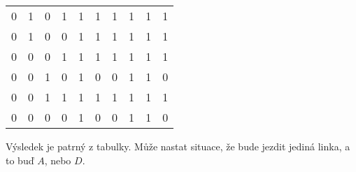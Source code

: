 \begin{example}[SMP 143/13]
\begin{widetext}
\begin{center}
\begin{tabular}{c c c c | c c c c c | c}
        0 & 1 & 0 & 1 & 1 & 1 & 1 & 1 & 1 & 1 \\
        0 & 1 & 0 & 0 & 1 & 1 & 1 & 1 & 1 & 1 \\
        0 & 0 & 0 & 1 & 1 & 1 & 1 & 1 & 1 & 1 \\
        0 & 0 & 1 & 0 & 1 & 0 & 0 & 1 & 1 & 0 \\
        0 & 0 & 1 & 1 & 1 & 1 & 1 & 1 & 1 & 1 \\
        0 & 0 & 0 & 0 & 1 & 0 & 0 & 1 & 1 & 0 \\
      \end{tabular}
    \end{center}
  \end{widetext}
  Výsledek je patrný z tabulky. Může nastat situace, že bude jezdit jediná linka, a to buď $A$, nebo $D$.
\end{example}

